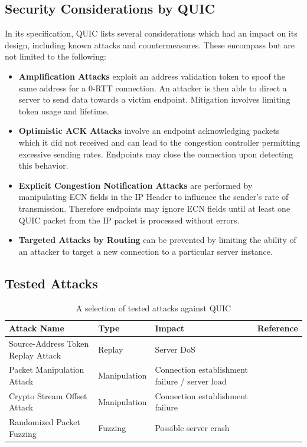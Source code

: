 \subsection{Security Considerations by QUIC}

In its specification, QUIC lists several considerations which had an impact on its design, including known attacks and countermeasures\cite{rfc9000}. These encompass but are not limited to the following:

\begin{itemize}
    \item \textbf{Amplification Attacks} exploit an address validation token to spoof the same address for a 0-RTT connection. An attacker is then able to direct a server to send data towards a victim endpoint. Mitigation involves limiting token usage and lifetime.
    \item \textbf{Optimistic ACK Attacks} involve an endpoint acknowledging packets which it did not received and can lead to the congestion controller permitting excessive sending rates. Endpoints may close the connection upon detecting this behavior.
    \item \textbf{Explicit Congestion Notification Attacks} are performed by manipulating ECN fields in the IP Header to influence the sender's rate of transmission. Therefore endpoints may ignore ECN fields until at least one QUIC packet from the IP packet is processed without errors.
    \item \textbf{Targeted Attacks by Routing} can be prevented by limiting the ability of an attacker to target a new connection to a particular server instance.
\end{itemize}

\subsection{Tested Attacks}

\begin{table}[H]
\begin{center}
    \begin{tabular}{| p{40mm} | l | p{60mm} | l |}
    \hline
    \textbf{Attack Name} & \textbf{Type} & \textbf{Impact} & \textbf{Reference} \\ \hline
    Source-Address Token Replay Attack & Replay & Server DoS & \cite{quic_security_2} \\ \hline
    Packet Manipulation Attack & Manipulation & Connection establishment failure / server load & \cite{quic_security_1} \cite{quic_security_2} \\ \hline
    Crypto Stream Offset Attack & Manipulation & Connection establishment failure & \cite{quic_security_1} \\ \hline
    Randomized Packet Fuzzing & Fuzzing & Possible server crash & \cite{quic_security_3} \\ \hline
    \end{tabular}
\end{center}
\caption{A selection of tested attacks against QUIC}
\label{table_tested_attacks}
\end{table}

